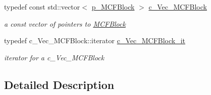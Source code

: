 \begin{DoxyCompactItemize}
\mbox{\label{group___m_c_f_block___t_y_p_e_s_ga00d6e7a4b4f82c756f3a49a60565947b}} 
typedef const std\+::vector$<$ \mbox{\hyperlink{group___m_c_f_block___t_y_p_e_s_gadd093efb785d0de13da72a397653b760}{p\+\_\+\+M\+C\+F\+Block}} $>$ \mbox{\hyperlink{group___m_c_f_block___t_y_p_e_s_ga00d6e7a4b4f82c756f3a49a60565947b}{c\+\_\+\+Vec\+\_\+\+M\+C\+F\+Block}}
\begin{DoxyCompactList}\small\item\em a const vector of pointers to \mbox{\hyperlink{class_s_m_spp__di__unipi__it_1_1_m_c_f_block}{M\+C\+F\+Block}} \end{DoxyCompactList}\item 
\mbox{\label{group___m_c_f_block___t_y_p_e_s_gabbeb5c1581a15a31c50b4adb6dffa6f3}} 
typedef c\+\_\+\+Vec\+\_\+\+M\+C\+F\+Block\+::iterator \mbox{\hyperlink{group___m_c_f_block___t_y_p_e_s_gabbeb5c1581a15a31c50b4adb6dffa6f3}{c\+\_\+\+Vec\+\_\+\+M\+C\+F\+Block\+\_\+it}}
\begin{DoxyCompactList}\small\item\em iterator for a c\+\_\+\+Vec\+\_\+\+M\+C\+F\+Block \end{DoxyCompactList}\end{DoxyCompactItemize}


\subsection{Detailed Description}

